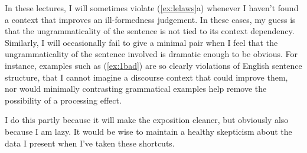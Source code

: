 {In these lectures, I will sometimes violate (\ref{ex:lelaws}a) whenever I haven't found a context that improves an ill-formedness judgement. In these cases, my guess is that the ungrammaticality of the sentence is not tied to its context dependency. Similarly, I will occasionally fail to give a minimal pair when I feel that the ungrammaticality of the sentence involved is dramatic enough to be obvious. For instance, examples such as (\ref{ex:1bad}) are so clearly violations of English sentence structure, that I cannot imagine a discourse context that could improve them, nor would minimally contrasting grammatical examples help remove the possibility of a processing effect.
\begin{exe}
\ex \label{ex:1bad} 
\begin{xlist}
\end{xlist}
\end{exe}
I do this partly because it will make the exposition cleaner, but obviously also because I am lazy. It would be wise to maintain a healthy skepticism about the data I present when I've taken these shortcuts.

}
